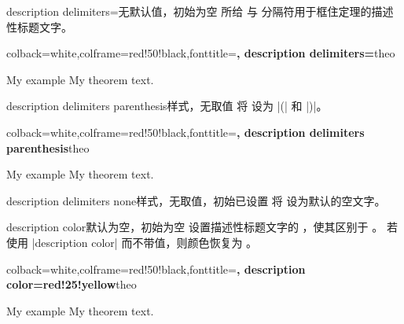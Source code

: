 \clearpage
\begin{docTcbKey}{description delimiters}{=}{无默认值，初始为空}
  所给  与  分隔符用于框住定理的描述性标题文字。

\begin{dispExample}
%
  {colback=white,colframe=red!50!black,fonttitle=\bfseries,
   description delimiters={\flqq}{\frqq}}{theo}
\begin{sometheorem}{My example}{}
My theorem text.
\end{sometheorem}
\end{dispExample}
\end{docTcbKey}


\begin{docTcbKey}{description delimiters parenthesis}{}{样式，无取值}
将  设为 |(| 和 |)|。
\begin{dispExample}
%
  {colback=white,colframe=red!50!black,fonttitle=\bfseries,
   description delimiters parenthesis}{theo}
\begin{sometheorem}{My example}{}
My theorem text.
\end{sometheorem}
\end{dispExample}
\end{docTcbKey}


\begin{docTcbKey}{description delimiters none}{}{样式，无取值，初始已设置}
将  设为默认的空文字。
\end{docTcbKey}


\begin{docTcbKey}{description color}{}{默认为空，初始为空}
  设置描述性标题文字的 ，使其区别于 。
  若使用 |description color| 而不带值，则颜色恢复为 。

\begin{dispExample}
%
  {colback=white,colframe=red!50!black,fonttitle=\bfseries,
   description color=red!25!yellow}{theo}
\begin{sometheorem}{My example}{}
My theorem text.
\end{sometheorem}
\end{dispExample}
\end{docTcbKey}


